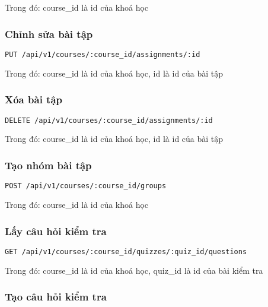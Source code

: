 \documentclass[../Thesis.tex]{subfiles}
\begin{document}
          Trong đó: course\_id là id của khoá học

        \subsubsection{Chỉnh sửa bài tập}
          \begin{lstlisting}[language=bash]
            PUT /api/v1/courses/:course_id/assignments/:id
          \end{lstlisting}

          Trong đó: course\_id là id của khoá học, id là id của bài tập

        \subsubsection{Xóa bài tập}

          \begin{lstlisting}[language=bash]
            DELETE /api/v1/courses/:course_id/assignments/:id
          \end{lstlisting}

          Trong đó: course\_id là id của khoá học, id là id của bài tập

        \subsubsection{Tạo nhóm bài tập}
          \begin{lstlisting}[language=bash]
            POST /api/v1/courses/:course_id/groups
          \end{lstlisting}

          Trong đó: course\_id là id của khoá học
          
        \subsubsection{Lấy câu hỏi kiểm tra}
          \begin{lstlisting}[language=bash]
            GET /api/v1/courses/:course_id/quizzes/:quiz_id/questions
          \end{lstlisting}

          Trong đó: course\_id là id của khoá học, quiz\_id là id của bài kiểm tra

        \subsubsection{Tạo câu hỏi kiểm tra}
\end{document}
